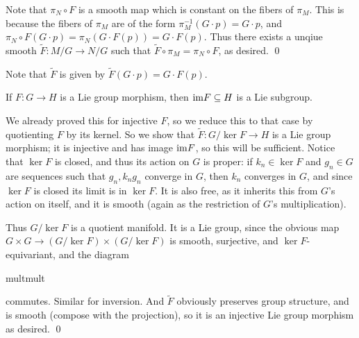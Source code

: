 \ethrm

\bproof

    Note that $\pi_N\circ F$ is a smooth map which is constant on the fibers of $\pi_M$.
    This is because the fibers of $\pi_M$ are of the form $\pi_M^{-1}(G\cdot p)=G\cdot p$, and $\pi_N\circ F(G\cdot p)=\pi_N(G\cdot F(p))=G\cdot F(p)$.
    Thus there exists a unqiue smooth $\tilde F\colon M/G\to N/G$ such that $\tilde F\circ\pi_M=\pi_N\circ F$, as desired.
    \qed

\eproof

Note that $\tilde F$ is given by $\tilde F(G\cdot p)=G\cdot F(p)$.

\bcoro

    If $F\colon G\to H$ is a Lie group morphism, then ${\rm im} F\subseteq H$ is a Lie subgroup.

\ecoro

\bproof

    We already proved this for injective $F$, so we reduce this to that case by quotienting $F$ by its kernel.
    So we show that $\tilde F\colon G/\ker F\to H$ is a Lie group morphism; it is injective and has image ${\rm im} F$, so this will be sufficient.
    Notice that $\ker F$ is closed, and thus its action on $G$ is proper: if $k_n\in\ker F$ and $g_n\in G$ are sequences such that $g_n,k_ng_n$
    converge in $G$, then $k_n$ converges in $G$, and since $\ker F$ is closed its limit is in $\ker F$.
    It is also free, as it inherits this from $G$'s action on itself, and it is smooth (again as the restriction of $G$'s multiplication).

    Thus $G/\ker F$ is a quotient manifold.
    It is a Lie group, since the obvious map $G\times G\to(G/\ker F)\times(G/\ker F)$ is smooth, surjective, and $\ker F$-equivariant, and the
    diagram

        {{\rm mult}}{{\rm mult}}{}{}

    commutes.
    Similar for inversion.
    And $\tilde F$ obviously preserves group structure, and is smooth (compose with the projection), so it is an injective Lie group morphism
    as desired.
    \qed

\eproof

